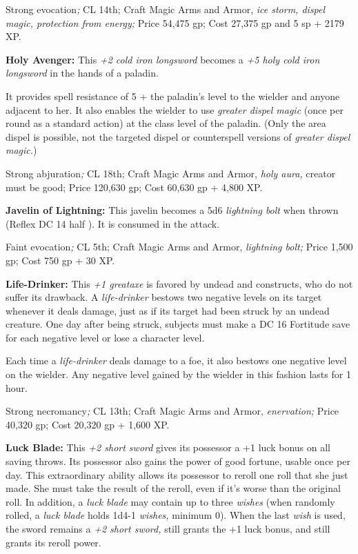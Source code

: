 \documentclass{article}
\begin{document}
Strong evocation\textit{; }CL 14th; Craft Magic Arms and Armor, \textit{ice storm, 
dispel magic, protection from energy; }Price 54,475 gp; Cost 27,375 gp and 5 sp 
+ 2179 XP.

\textbf{Holy Avenger: }This \textit{+2 cold iron longsword }becomes a \textit{+5 
holy cold iron longsword }in the hands of a paladin.

It provides spell resistance of 5 + the paladin's level to the wielder and anyone 
adjacent to her. It also enables the wielder to use \textit{greater dispel magic 
}(once per round as a standard action) at the class level of the paladin. (Only 
the area dispel is possible, not the targeted dispel or counterspell versions of 
\textit{greater dispel magic.})

Strong abjuration\textit{; }CL 18th; Craft Magic Arms and Armor, \textit{holy aura, 
}creator must be good; Price 120,630 gp; Cost 60,630 gp + 4,800 XP.

\textbf{Javelin of Lightning: }This javelin becomes a 5d6 \textit{lightning bolt 
}when thrown (Reflex DC 14 half ). It is consumed in the attack.

Faint evocation\textit{; }CL 5th; Craft Magic Arms and Armor, \textit{lightning 
bolt; }Price 1,500 gp; Cost 750 gp + 30 XP.

\textbf{Life-Drinker:} This \textit{+1 greataxe }is favored by undead and constructs, 
who do not suffer its drawback. A \textit{life-drinker }bestows two negative levels 
on its target whenever it deals damage, just as if its target had been struck by 
an undead creature. One day after being struck, subjects must make a DC 16 Fortitude 
save for each negative level or lose a character level.

Each time a \textit{life-drinker }deals damage to a foe, it also bestows one negative 
level on the wielder. Any negative level gained by the wielder in this fashion 
lasts for 1 hour.

Strong necromancy\textit{; }CL 13th; Craft Magic Arms and Armor, \textit{enervation; 
}Price 40,320 gp; Cost 20,320 gp + 1,600 XP.

\textbf{Luck Blade: }This \textit{+2 short sword }gives its possessor a +1 luck 
bonus on all saving throws. Its possessor also gains the power of good fortune, 
usable once per day. This extraordinary ability allows its possessor to reroll 
one roll that she just made. She must take the result of the reroll, even if it's 
worse than the original roll. In addition, a \textit{luck blade }may contain up 
to three \textit{wishes }(when randomly rolled, a \textit{luck blade }holds 1d4-1 
\textit{wishes, }minimum 0). When the last \textit{wish }is used, the sword remains 
a \textit{+2 short sword, }still grants the +1 luck bonus, and still grants its 
reroll power.
\end{document}
